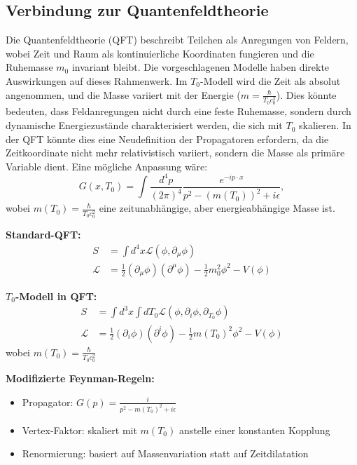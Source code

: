 \documentclass[a4paper,12pt]{article}
\begin{document}
	\subsection{Verbindung zur Quantenfeldtheorie}
	Die Quantenfeldtheorie (QFT) beschreibt Teilchen als Anregungen von Feldern, wobei Zeit und Raum als kontinuierliche Koordinaten fungieren und die Ruhemasse \( m_0 \) invariant bleibt. Die vorgeschlagenen Modelle haben direkte Auswirkungen auf dieses Rahmenwerk. Im \( T_0 \)-Modell wird die Zeit als absolut angenommen, und die Masse variiert mit der Energie (\( m = \frac{\hbar}{T_0 c_0^2} \)). Dies könnte bedeuten, dass Feldanregungen nicht durch eine feste Ruhemasse, sondern durch dynamische Energiezustände charakterisiert werden, die sich mit \( T_0 \) skalieren. In der QFT könnte dies eine Neudefinition der Propagatoren erfordern, da die Zeitkoordinate nicht mehr relativistisch variiert, sondern die Masse als primäre Variable dient. Eine mögliche Anpassung wäre:
	\[
	G(x, T_0) = \int \frac{d^4p}{(2\pi)^4} \frac{e^{-ip \cdot x}}{p^2 - (m(T_0))^2 + i\epsilon},
	\]
	wobei \( m(T_0) = \frac{\hbar}{T_0 c_0^2} \) eine zeitunabhängige, aber energieabhängige Masse ist.
	
	\begin{tcolorbox}[colback=yellow!5!white,colframe=yellow!75!black,title=Umformulierung von QFT-Konzepten]
		\textbf{Standard-QFT:}
		\begin{align}
			S &= \int d^4x \mathcal{L}(\phi, \partial_\mu\phi) \\
			\mathcal{L} &= \frac{1}{2}(\partial_\mu\phi)(\partial^\mu\phi) - \frac{1}{2}m_0^2\phi^2 - V(\phi)
		\end{align}
		
		\textbf{$T_0$-Modell in QFT:}
		\begin{align}
			S &= \int d^3x \int dT_0 \mathcal{L}(\phi, \partial_i\phi, \partial_{T_0}\phi) \\
			\mathcal{L} &= \frac{1}{2}(\partial_i\phi)(\partial^i\phi) - \frac{1}{2}m(T_0)^2\phi^2 - V(\phi)
		\end{align}
		wobei $m(T_0) = \frac{\hbar}{T_0 c_0^2}$
		
		\textbf{Modifizierte Feynman-Regeln:}
		\begin{itemize}
			\item Propagator: $G(p) = \frac{i}{p^2 - m(T_0)^2 + i\epsilon}$
			\item Vertex-Faktor: skaliert mit $m(T_0)$ anstelle einer konstanten Kopplung
			\item Renormierung: basiert auf Massenvariation statt auf Zeitdilatation
		\end{itemize}
	\end{tcolorbox}
	
\end{document}
